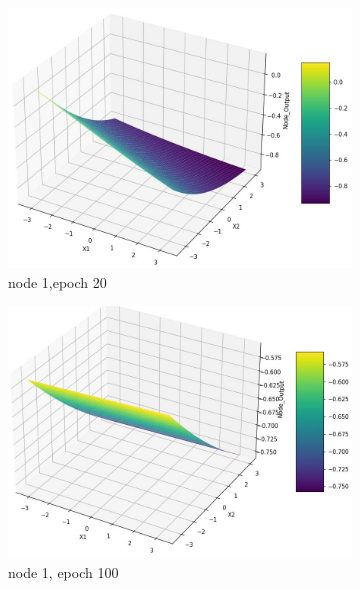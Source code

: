 \documentclass[11pt]{article}
\begin{document}
\begin{figure}[h]
\begin{subfigure}[b]{0.18\textwidth}
	\includegraphics[scale=0.14]{hidden1_n1_e20.jpg}
	\caption{node 1,epoch 20}
	\label{fig:fig2.1.4.3}
	\end{subfigure}
	\begin{subfigure}[b]{0.18\textwidth}
	\centering
	\includegraphics[scale=0.14]{hidden1_n1_e100.jpg}
	\caption{node 1, epoch 100}
	\label{fig:fig2.1.4.4}
	\end{subfigure}
	\begin{subfigure}[b]{0.18\textwidth}
	\centering

\end{subfigure}
\end{figure}
\end{document}
